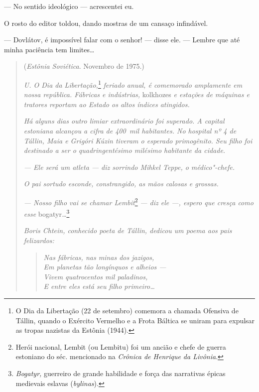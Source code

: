 --- No sentido ideológico --- acrescentei eu.

O rosto do editor toldou, dando mostras de um cansaço infindável.

--- Dovlátov, é impossível falar com o senhor! --- disse ele. --- Lembre
que até minha paciência tem limites\ldots{}


\movetooddpage
\begin{center}
{}
\end{center}

\begin{quotation}
\begin{flushright}
(\emph{Estônia Soviética}. Novembro de 1975.)
\end{flushright}
\vspace{4pt}
\noindent\emph{U. O Dia da Libertação,}\footnote{O Dia da
  Libertação (22 de setembro) comemora a chamada Ofensiva de Tállin,
  quando o Exército Vermelho e a Frota Báltica se uniram para expulsar
  as tropas nazistas da Estônia (1944).} \emph{feriado anual, é
comemorado amplamente em nossa república. Fábricas e indústrias,}
kolkhozes \emph{e estações de máquinas e tratores reportam ao Estado os %
altos índices atingidos.}

\emph{Há alguns dias outro limiar extraordinário foi superado. A capital
estoniana alcançou a cifra de 400~mil habitantes. No hospital nº 4 de
Tállin, Maia e Grigóri Kúzin tiveram o esperado primogênito. Seu filho
foi destinado a ser o quadringentésimo milésimo habitante da cidade.}

\emph{--- Ele será um atleta --- diz sorrindo Mihkel Teppe, o
médico"-chefe.}

\emph{O pai sortudo esconde, constrangido, as mãos calosas e grossas.}

\emph{--- Nosso filho vai se chamar Lembit}\footnote{Herói nacional,
  Lembit (ou Lembitu) foi um ancião e chefe de guerra estoniano do séc.
   mencionado na \emph{Crônica de Henrique da Livônia}.} \emph{--- diz ele
---, espero que cresça como esse} bogatyr\emph{\ldots{}}\footnote{\emph{Bogatyr,}
  guerreiro de grande habilidade e força das narrativas épicas medievais
  eslavas (\emph{bylinas}).}

\emph{Boris Chtein, conhecido poeta de Tállin, dedicou um poema aos pais
felizardos:}

\begin{verse}
\emph{Nas fábricas, nas minas dos jazigos,}\\
\emph{Em planetas tão longínquos e \qb{}alheios ---}\\
\emph{Vivem quatrocentos mil paladinos,}\\
\emph{E entre eles está seu filho primeiro\ldots{}}
\end{verse}


\end{quotation}
